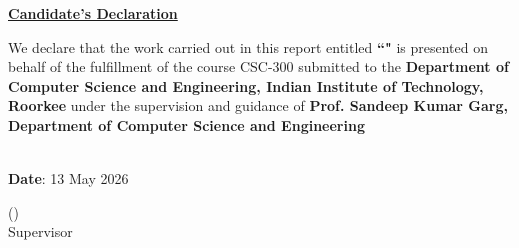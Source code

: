 \documentclass[11pt, english, onehalfspacing, headsepline,oneside]{MastersDoctoralThesis}
\begin{document}
\begin{center}
	\textbf{\underline{{Candidate's Declaration}}}
\end{center}


\vspace{0.5cm}
We declare that the work carried out in this report entitled \textbf{“\ttitle"} is presented on behalf of the fulfillment of the course CSC-300 submitted to the \textbf{Department of Computer Science and Engineering, Indian Institute of Technology, Roorkee} under the supervision and guidance of \textbf{Prof. Sandeep Kumar Garg, Department of Computer Science and Engineering}
\vspace{1.5cm}

\begin{flushright}
	\authorname
\end{flushright}
\vspace{.3cm}
\vspace{2cm}

\begin{minipage}[b]{0.45\textwidth}
		\begin{flushleft}
		~\\\vspace{-1.5ex} {\bf Date}: 13 May 2026
		\end{flushleft}
\end{minipage}
\begin{minipage}[b]{0.5\textwidth}
\begin{flushright}

(\supname)\\\vspace{-1cm}Supervisor \\
\end{flushright}
\end{minipage}



\clearpage
\end{document}
